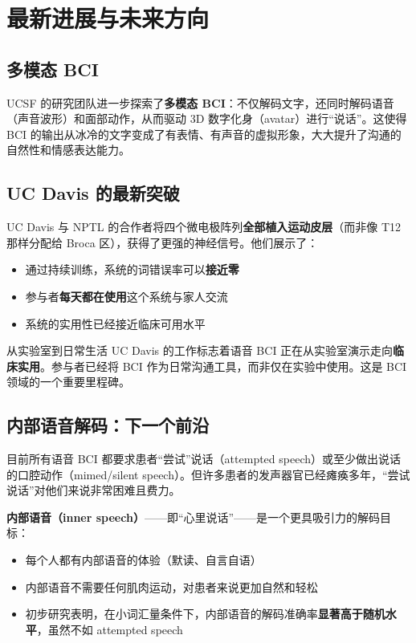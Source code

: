 \documentclass[a4paper]{article}
\begin{document}

\section{最新进展与未来方向}

\subsection{多模态 BCI}

UCSF 的研究团队进一步探索了\textbf{多模态 BCI}：不仅解码文字，还同时解码语音（声音波形）和面部动作，从而驱动 3D 数字化身（avatar）进行``说话''。这使得 BCI 的输出从冰冷的文字变成了有表情、有声音的虚拟形象，大大提升了沟通的自然性和情感表达能力。

\subsection{UC Davis 的最新突破}

UC Davis 与 NPTL 的合作者将四个微电极阵列\textbf{全部植入运动皮层}（而非像 T12 那样分配给 Broca 区），获得了更强的神经信号。他们展示了：

\begin{itemize}
    \item 通过持续训练，系统的词错误率可以\textbf{接近零}
    \item 参与者\textbf{每天都在使用}这个系统与家人交流
    \item 系统的实用性已经接近临床可用水平
\end{itemize}

\begin{importantbox}{从实验室到日常生活}
UC Davis 的工作标志着语音 BCI 正在从实验室演示走向\textbf{临床实用}。参与者已经将 BCI 作为日常沟通工具，而非仅在实验中使用。这是 BCI 领域的一个重要里程碑。
\end{importantbox}

\subsection{内部语音解码：下一个前沿}

目前所有语音 BCI 都要求患者``尝试''说话（attempted speech）或至少做出说话的口腔动作（mimed/silent speech）。但许多患者的发声器官已经瘫痪多年，``尝试说话''对他们来说非常困难且费力。

\textbf{内部语音（inner speech）}——即``心里说话''——是一个更具吸引力的解码目标：

\begin{itemize}
    \item 每个人都有内部语音的体验（默读、自言自语）
    \item 内部语音不需要任何肌肉运动，对患者来说更加自然和轻松
    \item 初步研究表明，在小词汇量条件下，内部语音的解码准确率\textbf{显著高于随机水平}，虽然不如 attempted speech
\end{itemize}
\end{document}
